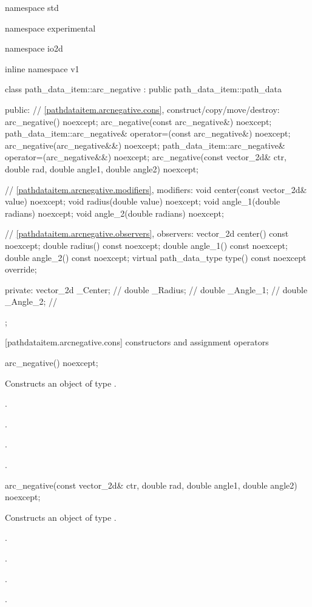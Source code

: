 \begin{codeblock}
namespace std { namespace experimental { namespace io2d { inline namespace v1 {
  class path_data_item::arc_negative : public path_data_item::path_data {
  public:
    // \ref{pathdataitem.arcnegative.cons}, construct/copy/move/destroy:
    arc_negative() noexcept;
    arc_negative(const arc_negative&) noexcept;
    path_data_item::arc_negative& operator=(const arc_negative&) noexcept;
    arc_negative(arc_negative&&) noexcept;
    path_data_item::arc_negative& operator=(arc_negative&&) noexcept;
    arc_negative(const vector_2d& ctr, double rad, double angle1,
      double angle2) noexcept;

    // \ref{pathdataitem.arcnegative.modifiers}, modifiers:
    void center(const vector_2d& value) noexcept;
    void radius(double value) noexcept;
    void angle_1(double radians) noexcept;
    void angle_2(double radians) noexcept;

    // \ref{pathdataitem.arcnegative.observers}, observers:
    vector_2d center() const noexcept;
    double radius() const noexcept;
    double angle_1() const noexcept;
    double angle_2() const noexcept;
    virtual path_data_type type() const noexcept override;

  private:
    vector_2d _Center;   // \expos
    double _Radius;  // \expos
    double _Angle_1; // \expos
    double _Angle_2; // \expos
  };
} } } }
\end{codeblock}

 [pathdataitem.arcnegative.cons] { constructors and assignment operators}

\begin{itemdecl}
    arc_negative() noexcept;
\end{itemdecl}
\begin{itemdescr}
	\pnum
	\effects
	Constructs an object of type .
	
	\pnum
	\postconditions
	.

	.

	.

	.
\end{itemdescr}

\begin{itemdecl}
    arc_negative(const vector_2d& ctr, double rad, double angle1,
      double angle2) noexcept;
\end{itemdecl}
\begin{itemdescr}
	\pnum
	\effects
	Constructs an object of type .
	
	\pnum
	\postconditions
	.

	.

	.

	.
\end{itemdescr}

